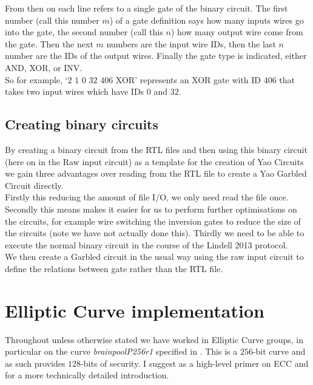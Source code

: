 \documentclass[ %
                    author={Nicholas Tutte},
                supervisor={Prof. Nigel Smart},
                    degree={MEng},
                     title={Secure Two Party Computation},
                  subtitle={A practical comparison of recent protocols},
                      type={Research - GG1K},
                      year={2015} ]{dissertation}
\begin{document}
\begin{appendices}
					From then on each line refers to a single gate of the binary circuit. The first number (call this number $m$) of a gate definition says how many inputs wires go into the gate, the second number (call this $n$) how many output wire come from the gate. Then the next $m$ numbers are the input wire IDs, then the last $n$ number are the IDs of the output wires. Finally the gate type is indicated, either AND, XOR, or INV.\\

					So for example, `$2$ $1$ $0$ $32$ $406$ XOR' represents an XOR gate with ID $406$ that takes two input wires which have IDs $0$ and $32$.

				\subsection{Creating binary circuits}
					By creating a binary circuit from the RTL files and then using this binary circuit (here on in the Raw input circuit) as a template for the creation of Yao Circuits we gain three advantages over reading from the RTL file to create a Yao Garbled Circuit directly.\\

					Firstly this reducing the amount of file I/O, we only need read the file once. Secondly this means makes it easier for us to perform further optimisations on the circuits, for example wire switching the inversion gates to reduce the size of the circuits (note we have not actually done this). Thirdly we need to be able to execute the normal binary circuit in the course of the Lindell 2013 protocol.\\

					We then create a Garbled circuit in the usual way using the raw input circuit to define the relations between gate rather than the RTL file.

			\section{Elliptic Curve implementation}

				Throughout unless otherwise stated we have worked in Elliptic Curve groups, in particular on the curve \emph{brainpoolP256r1} specified in \cite{BrainpoolSpecifications}. This is a $256$-bit curve and as such provides $128$-bits of security. I suggest \cite{ECC_Primer} as a high-level primer on ECC and \cite{ECC_RFC_6090} for a more technically detailed introduction.\\


\end{appendices}
\end{document}
